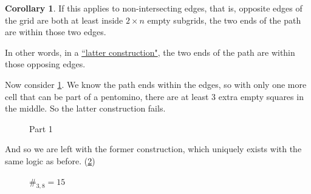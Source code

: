 \documentclass{article}
\theoremstyle{definition}%
\newtheorem{corollary}[theorem]{Corollary}%
\begin{document}
\begin{corollary}
If this applies to non-intersecting edges, that is, opposite edges of the grid are both at least inside $2 \times n$ empty subgrids, the two ends of the path are within those two edges.
\end{corollary}

In other words, in a \hyperref[def:3814lc]{``latter construction"}, the two ends of the path are within those opposing edges.

Now consider \cref{fig:3x8p1}. We know the path ends within the edges, so with only one more
cell that can be part of a pentomino, there are at least 3 extra empty squares in the middle.
So the latter construction fails.

\begin{figure}[htbp!]
    \centering
    \caption{Part 1}
    \label{fig:3x8p1}
\end{figure}

And so we are left with the former construction, which uniquely exists with the same logic as before. (\cref{fig:3x8})
\begin{figure}[htbp!]
    \centering
    \caption{$\#_{3,8} = 15$}
    \label{fig:3x8}
\end{figure}
\end{document}
